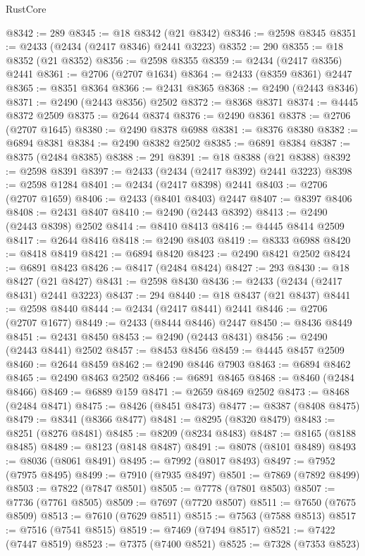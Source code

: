 \begin{lexlean}{RustCore}
\begin{coremodule}
@8342 := 289
@8345 := @18 @8342 (@21 @8342)
@8346 := @2598 @8345
@8351 := @2433 (@2434 (@2417 @8346) @2441 @3223)
@8352 := 290
@8355 := @18 @8352 (@21 @8352)
@8356 := @2598 @8355
@8359 := @2434 (@2417 @8356) @2441
@8361 := @2706 (@2707 @1634)
@8364 := @2433 (@8359 @8361) @2447
@8365 := @8351 @8364
@8366 := @2431 @8365
@8368 := @2490 (@2443 @8346)
@8371 := @2490 (@2443 @8356) @2502
@8372 := @8368 @8371
@8374 := @4445 @8372 @2509
@8375 := @2644 @8374
@8376 := @2490 @8361
@8378 := @2706 (@2707 @1645)
@8380 := @2490 @8378 @6988
@8381 := @8376 @8380
@8382 := @6894 @8381
@8384 := @2490 @8382 @2502
@8385 := @6891 @8384
@8387 := @8375 (@2484 @8385)
@8388 := 291
@8391 := @18 @8388 (@21 @8388)
@8392 := @2598 @8391
@8397 := @2433 (@2434 (@2417 @8392) @2441 @3223)
@8398 := @2598 @1284
@8401 := @2434 (@2417 @8398) @2441
@8403 := @2706 (@2707 @1659)
@8406 := @2433 (@8401 @8403) @2447
@8407 := @8397 @8406
@8408 := @2431 @8407
@8410 := @2490 (@2443 @8392)
@8413 := @2490 (@2443 @8398) @2502
@8414 := @8410 @8413
@8416 := @4445 @8414 @2509
@8417 := @2644 @8416
@8418 := @2490 @8403
@8419 := @8333 @6988
@8420 := @8418 @8419
@8421 := @6894 @8420
@8423 := @2490 @8421 @2502
@8424 := @6891 @8423
@8426 := @8417 (@2484 @8424)
@8427 := 293
@8430 := @18 @8427 (@21 @8427)
@8431 := @2598 @8430
@8436 := @2433 (@2434 (@2417 @8431) @2441 @3223)
@8437 := 294
@8440 := @18 @8437 (@21 @8437)
@8441 := @2598 @8440
@8444 := @2434 (@2417 @8441) @2441
@8446 := @2706 (@2707 @1677)
@8449 := @2433 (@8444 @8446) @2447
@8450 := @8436 @8449
@8451 := @2431 @8450
@8453 := @2490 (@2443 @8431)
@8456 := @2490 (@2443 @8441) @2502
@8457 := @8453 @8456
@8459 := @4445 @8457 @2509
@8460 := @2644 @8459
@8462 := @2490 @8446 @7903
@8463 := @6894 @8462
@8465 := @2490 @8463 @2502
@8466 := @6891 @8465
@8468 := @8460 (@2484 @8466)
@8469 := @6889 @159
@8471 := @2659 @8469 @2502
@8473 := @8468 (@2484 @8471)
@8475 := @8426 (@8451 @8473)
@8477 := @8387 (@8408 @8475)
@8479 := @8341 (@8366 @8477)
@8481 := @8295 (@8320 @8479)
@8483 := @8251 (@8276 @8481)
@8485 := @8209 (@8234 @8483)
@8487 := @8165 (@8188 @8485)
@8489 := @8123 (@8148 @8487)
@8491 := @8078 (@8101 @8489)
@8493 := @8036 (@8061 @8491)
@8495 := @7992 (@8017 @8493)
@8497 := @7952 (@7975 @8495)
@8499 := @7910 (@7935 @8497)
@8501 := @7869 (@7892 @8499)
@8503 := @7822 (@7847 @8501)
@8505 := @7778 (@7801 @8503)
@8507 := @7736 (@7761 @8505)
@8509 := @7697 (@7720 @8507)
@8511 := @7650 (@7675 @8509)
@8513 := @7610 (@7629 @8511)
@8515 := @7563 (@7588 @8513)
@8517 := @7516 (@7541 @8515)
@8519 := @7469 (@7494 @8517)
@8521 := @7422 (@7447 @8519)
@8523 := @7375 (@7400 @8521)
@8525 := @7328 (@7353 @8523)

\end{coremodule}
\end{lexlean}
